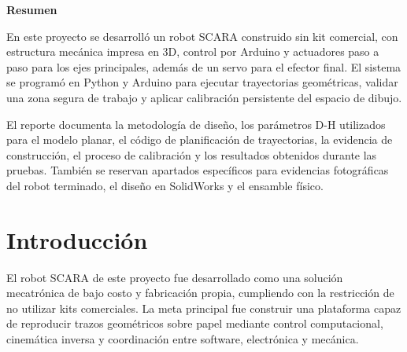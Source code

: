 \documentclass[11pt,letterpaper,onecolumn]{article}
\begin{document}
\noindent
\begin{tcolorbox}[
  colback  = bgLight,
  colframe = vinoUAG,
  boxrule  = 1pt,
  arc      = 2pt,
  left     = 8pt,
  right    = 8pt,
  top      = 6pt,
  bottom   = 6pt,
  fontupper = \normalsize\color{darkText},
  breakable,
]
\noindent\textbf{\color{vinoUAG}Resumen}

\vspace{0.3cm}

En este proyecto se desarrolló un robot SCARA construido sin kit comercial, con estructura mecánica impresa en 3D, control por Arduino y actuadores paso a paso para los ejes principales, además de un servo para el efector final. El sistema se programó en Python y Arduino para ejecutar trayectorias geométricas, validar una zona segura de trabajo y aplicar calibración persistente del espacio de dibujo.

El reporte documenta la metodología de diseño, los parámetros D-H utilizados para el modelo planar, el código de planificación de trayectorias, la evidencia de construcción, el proceso de calibración y los resultados obtenidos durante las pruebas. También se reservan apartados específicos para evidencias fotográficas del robot terminado, el diseño en SolidWorks y el ensamble físico.

\end{tcolorbox}

\vspace{0.8cm}

\vspace{2.0cm}

\twocolumn

\color{darkText}



\section{Introducción}
\justify

El robot SCARA de este proyecto fue desarrollado como una solución mecatrónica de bajo costo y fabricación propia, cumpliendo con la restricción de no utilizar kits comerciales. La meta principal fue construir una plataforma capaz de reproducir trazos geométricos sobre papel mediante control computacional, cinemática inversa y coordinación entre software, electrónica y mecánica.
\end{document}
